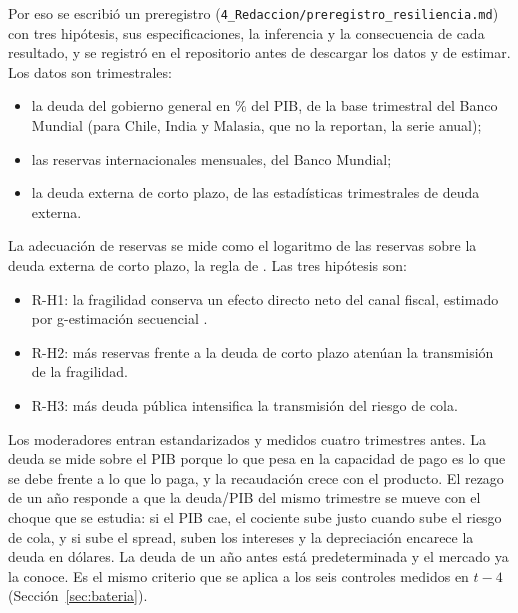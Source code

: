 Por eso se escribió un preregistro (\texttt{4\_Redaccion/preregistro\_resiliencia.md}) con tres hipótesis, sus especificaciones, la inferencia y la consecuencia de cada resultado, y se registró en el repositorio antes de descargar los datos y de estimar. Los datos son trimestrales:
\begin{itemize}
    \item la deuda del gobierno general en \% del PIB, de la base trimestral del Banco Mundial (para Chile, India y Malasia, que no la reportan, la serie anual);
    \item las reservas internacionales mensuales, del Banco Mundial;
    \item la deuda externa de corto plazo, de las estadísticas trimestrales de deuda externa.
\end{itemize}
La adecuación de reservas se mide como el logaritmo de las reservas sobre la deuda externa de corto plazo, la regla de \citet{Greenspan1999}. Las tres hipótesis son:
\begin{itemize}
    \item R-H1: la fragilidad conserva un efecto directo neto del canal fiscal, estimado por g-estimación secuencial \citep{AcharyaBlackwellSen2016}.
    \item R-H2: más reservas frente a la deuda de corto plazo atenúan la transmisión de la fragilidad.
    \item R-H3: más deuda pública intensifica la transmisión del riesgo de cola.
\end{itemize}
Los moderadores entran estandarizados y medidos cuatro trimestres antes. La deuda se mide sobre el PIB porque lo que pesa en la capacidad de pago es lo que se debe frente a lo que lo paga, y la recaudación crece con el producto. El rezago de un año responde a que la deuda/PIB del mismo trimestre se mueve con el choque que se estudia: si el PIB cae, el cociente sube justo cuando sube el riesgo de cola, y si sube el spread, suben los intereses y la depreciación encarece la deuda en dólares. La deuda de un año antes está predeterminada y el mercado ya la conoce. Es el mismo criterio que se aplica a los seis controles medidos en $t-4$ (Sección~\ref{sec:bateria}).

